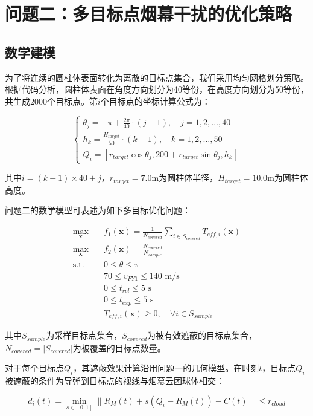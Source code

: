 \section{问题二：多目标点烟幕干扰的优化策略}

\subsection{数学建模}

为了将连续的圆柱体表面转化为离散的目标点集合，我们采用均匀网格划分策略。根据代码分析，圆柱体表面在角度方向划分为40等份，在高度方向划分为50等份，共生成2000个目标点。第$i$个目标点的坐标计算公式为：

\[
\begin{cases}
\theta_j = -\pi + \frac{2\pi}{40} \cdot (j-1), \quad j = 1,2,\ldots,40 \\
h_k = \frac{H_{target}}{50} \cdot (k-1), \quad k = 1,2,\ldots,50 \\
Q_i = [r_{target}\cos\theta_j, 200 + r_{target}\sin\theta_j, h_k]
\end{cases}
\]

其中$i = (k-1) \times 40 + j$，$r_{target} = 7.0$m为圆柱体半径，$H_{target} = 10.0$m为圆柱体高度。

问题二的数学模型可表述为如下多目标优化问题：

\[
\begin{aligned}
\max_{\mathbf{x}} \quad & f_1(\mathbf{x}) = \frac{1}{N_{covered}} \sum_{i \in S_{covered}} T_{eff,i}(\mathbf{x}) \\
\max_{\mathbf{x}} \quad & f_2(\mathbf{x}) = \frac{N_{covered}}{N_{sample}} \\
\text{s.t.} \quad & 0 \leq \theta \leq \pi \\
& 70 \leq v_{FY1} \leq 140 \text{ m/s} \\
& 0 \leq t_{rel} \leq 5 \text{ s} \\
& 0 \leq t_{exp} \leq 5 \text{ s} \\
& T_{eff,i}(\mathbf{x}) \geq 0, \quad \forall i \in S_{sample}
\end{aligned}
\]

其中$S_{sample}$为采样目标点集合，$S_{covered}$为被有效遮蔽的目标点集合，$N_{covered} = |S_{covered}|$为被覆盖的目标点数量。

对于每个目标点$Q_i$，其遮蔽效果计算沿用问题一的几何模型。在时刻$t$，目标点$Q_i$被遮蔽的条件为导弹到目标点的视线与烟幕云团球体相交：

\[
d_i(t) = \min_{s \in [0,1]} \|R_M(t) + s(Q_i - R_M(t)) - C(t)\| \leq r_{cloud}
\]

